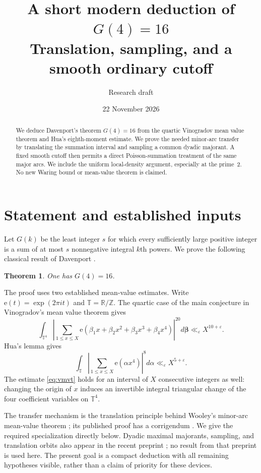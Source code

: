 \documentclass[11pt]{article}
\title{A short modern deduction of \(G(4)=16\)\\
\large Translation, sampling, and a smooth ordinary cutoff}
\author{Research draft}
\date{22 November 2026}
\newtheorem{theorem}{Theorem}
\theoremstyle{remark}\newtheorem*{remark}{Remark}
\newcommand{\e}{\mathrm e}
\newcommand{\T}{\mathbb T}
\newcommand{\eps}{\varepsilon}
\begin{document}
\maketitle
\begin{abstract}
We deduce Davenport's theorem \(G(4)=16\) from the quartic Vinogradov mean
value theorem and Hua's eighth-moment estimate. We prove the needed
minor-arc transfer by translating the summation interval and sampling a
common dyadic majorant. A fixed smooth cutoff then permits a direct
Poisson-summation treatment of the same major arcs. We include the uniform
local-density argument, especially at the prime~2. No new Waring bound or
mean-value theorem is claimed.
\end{abstract}

\section{Statement and established inputs}

Let \(G(k)\) be the least integer \(s\) for which every sufficiently large
positive integer is a sum of at most \(s\) nonnegative integral \(k\)th powers.
We prove the following classical result of Davenport \cite{Davenport}.
\begin{theorem}\label{thm:main}
One has \(G(4)=16\).
\end{theorem}

The proof uses two established mean-value estimates. Write
\(\e(t)=\exp(2\pi it)\) and \(\T=\mathbb R/\mathbb Z\). The quartic case of
the main conjecture in Vinogradov's mean value theorem
\cite[Theorem~1.1]{BDG} gives
\begin{equation}\label{eq:vmvt}
 \int_{\T^4}\left|\sum_{1\le x\le X}
 \e(\beta_1x+\beta_2x^2+\beta_3x^3+\beta_4x^4)\right|^{20}
 d\boldsymbol\beta\ll_\eps X^{10+\eps}.
\end{equation}
Hua's lemma \cite[Lemma~2.5]{Vaughan} gives
\begin{equation}\label{eq:hua}
 \int_\T\left|\sum_{1\le x\le X}\e(\alpha x^4)\right|^8d\alpha
 \ll_\eps X^{5+\eps}.
\end{equation}
The estimate \eqref{eq:vmvt} holds for an interval of \(X\) consecutive
integers as well: changing the origin of \(x\) induces an invertible
integral triangular change of the four coefficient variables on \(\T^4\).

The transfer mechanism is the translation principle behind
Wooley's minor-arc mean-value theorem \cite[Theorem~2.1]{Wooley}; its
published proof has a corrigendum \cite{Wooleycorr}. We give the required
specialization directly below. Dyadic maximal majorants, sampling, and
translation orbits also appear in the recent preprint \cite[Sections~3--5]{Hu};
no result from that preprint is used here. The present goal is a compact
deduction with all remaining hypotheses visible, rather than a claim of
priority for these devices.
\end{document}
